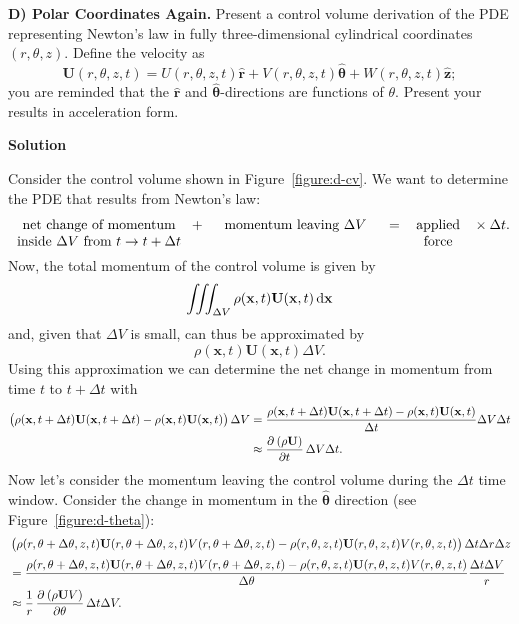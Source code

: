 \documentclass{article}
\def\*#1{\mathbf{#1}}
\newcommand{\rhat}{\mathbf{\hat{r}}}
\newcommand{\thetahat}{\boldsymbol{\hat{\theta}}}
\newcommand{\zhat}{\mathbf{\hat{z}}}
\begin{document}
\newpage

\textbf{D) Polar Coordinates Again.} Present a control volume derivation
of the PDE representing Newton's law in fully three-dimensional cylindrical
coordinates $(r, \theta, z)$. Define the velocity as
%
\begin{equation*}
    \*U(r, \theta, z, t)
        = U(r, \theta, z, t) \rhat
          + V(r, \theta, z, t) \thetahat
          + W(r, \theta, z, t) \zhat
          ;
\end{equation*}
%
you are reminded that the $\rhat$ and $\thetahat$-directions are
functions of $\theta$. Present your results in acceleration form.

\textbf{Solution}

Consider the control volume shown in Figure~\ref{figure:d-cv}. We want
to determine the PDE that results from Newton's law:
%
\begin{equation*}
    \parbox[t]{13em}{\centering
        net change of momentum inside $\Delta V$ from $t \to t + \Delta t$
    }
    +
    \parbox[t]{13em}{\centering
        momentum leaving $\Delta V$
    }
    =
    \parbox[t]{5em}{\centering
        applied force
    }
    \times
    \Delta t
    .
\end{equation*}
%
Now, the total momentum of the control volume is given by
%
\begin{equation*}
    \iiint_{\Delta V} \rho(\*x, t) \*U(\*x, t) \dif \*x
\end{equation*}
%
and, given that $\Delta V$ is small, can thus be approximated by
%
\begin{equation*}
    \rho(\*x, t) \*U(\*x, t) \Delta V
    .
\end{equation*}
%
Using this approximation we can determine the net change in momentum
from time $t$ to $t + \Delta t$ with
%
\begin{align*}
    \del{
        \rho(\*x, t + \Delta t ) \*U(\*x, t + \Delta t )
        - \rho(\*x, t) \*U(\*x, t)
    } \Delta V
    &= \frac{
        \rho(\*x, t + \Delta t ) \*U(\*x, t + \Delta t )
        - \rho(\*x, t) \*U(\*x, t)
    }{\Delta t} \Delta V \Delta t \\
    &\approx \dpd{\del{\rho \*U}}{t} \Delta V \Delta t
    .
\end{align*}
%
Now let's consider the momentum leaving the control volume during the
$\Delta t$ time window. Consider the change in momentum in the
$\thetahat$ direction (see Figure~\ref{figure:d-theta}):
%
\begin{align*}
    &
    \del{
        \rho(r, \theta + \Delta \theta, z, t)
        \*U(r, \theta + \Delta \theta, z, t)
        V(r, \theta + \Delta \theta, z, t)
        - \rho(r, \theta, z, t)
        \*U(r, \theta, z, t)
        V(r, \theta, z, t)
    } \Delta t \Delta r \Delta z \\[0.5ex]
    &=
    \frac{
        \rho(r, \theta + \Delta \theta, z, t)
        \*U(r, \theta + \Delta \theta, z, t)
        V(r, \theta + \Delta \theta, z, t)
        - \rho(r, \theta, z, t)
        \*U(r, \theta, z, t)
        V(r, \theta, z, t)
    }{\Delta \theta}
    \frac{\Delta t \Delta V}{r} \\
    &\approx
    \frac{1}{r} \dpd{\del{\rho \*U V}}{\theta} \Delta t \Delta V
    .
\end{align*}
\end{document}
